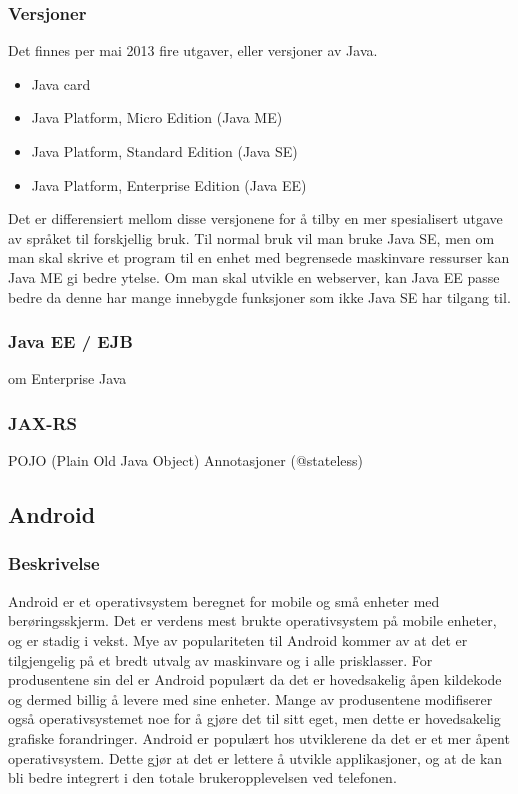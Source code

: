 \documentclass[../main.tex]{subfiles}
\begin{document}
\subsubsection{Versjoner}
Det finnes per mai 2013 fire utgaver, eller versjoner av Java.
\begin{itemize}
\item Java card
\item Java Platform, Micro Edition (Java ME)
\item Java Platform, Standard Edition (Java SE)
\item Java Platform, Enterprise Edition (Java EE)
\end{itemize}

Det er differensiert mellom disse versjonene for å tilby en mer spesialisert utgave av språket til forskjellig bruk. Til normal bruk vil man bruke Java SE, men om man skal skrive et program til en enhet med begrensede maskinvare ressurser kan Java ME gi bedre ytelse. Om man skal utvikle en webserver, kan Java EE passe bedre da denne har mange innebygde funksjoner som ikke Java SE har tilgang til.

\subsubsection{Java EE / EJB}
om Enterprise Java

\subsubsection{JAX-RS}
POJO (Plain Old Java Object) 
Annotasjoner (@stateless)

\subsection{Android}
\subsubsection{Beskrivelse}
Android er et operativsystem beregnet for mobile og små enheter med berøringsskjerm. Det er verdens mest brukte operativsystem på mobile enheter, og er stadig i vekst. Mye av populariteten til Android kommer av at det er tilgjengelig på et bredt utvalg av maskinvare og i alle prisklasser. For produsentene sin del er Android populært da det er hovedsakelig åpen kildekode og dermed billig å levere med sine enheter. Mange av produsentene modifiserer også operativsystemet noe for å gjøre det til sitt eget, men dette er hovedsakelig grafiske forandringer.
Android er populært hos utviklerene da det er et mer åpent operativsystem. Dette gjør at det er lettere å utvikle applikasjoner, og at de kan bli bedre integrert i den totale brukeropplevelsen ved telefonen.
\end{document}
